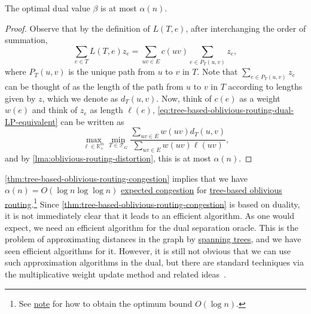 \begin{theorem}\label{thm:tree-based-oblivious-routing-congestion}
	The optimal dual value \(\beta \) is at most \(\alpha (n)\).
\end{theorem}
\begin{proof}
	Observe that by the definition of \(L(T, e)\), after interchanging the order of summation,
	\[
		\sum_{e \in T} L(T, e) z_e
		= \sum_{uv \in E} c(uv) \sum_{e \in P_T(u, v)}  z_e,
	\]
	where \(P_T(u, v)\) is the unique path from \(u\) to \(v\) in \(T\). Note that \(\sum_{e \in P_T(u, v)} z_e\) can be thought of as the length of the path from \(u\) to \(v\) in \(T\) according to lengths given by \(z\), which we denote as \(d_T(u, v)\). Now, think of \(c(e)\) as a weight \(w(e)\) and think of \(z_e\) as length \(\ell (e)\), \autoref{eq:tree-based-oblivious-routing-dual-LP-equivalent} can be written as
	\[
		\max _{\ell \in \mathbb{R} _{+}^m} \min _{T \in \mathcal{T} _G} \frac{\sum_{uv \in E} w(uv) d_T(u, v)}{\sum_{uv \in E} w(uv) \ell (uv)},
	\]
	and by \autoref{lma:oblivious-routing-distortion}, this is at most \(\alpha (n)\).
\end{proof}

\autoref{thm:tree-based-oblivious-routing-congestion} implies that we have \(\alpha (n) = O(\log n \log \log n)\) \hyperref[def:expected-congestion]{expected congestion} for \hyperref[not:tree-based-oblivious-routing]{tree-based oblivious routing}.\footnote{See \href{https://courses.grainger.illinois.edu/cs598csc/fa2024/Notes/lec-oblivious-routing.pdf}{note} for how to obtain the optimum bound \(O(\log n)\).} Since \autoref{thm:tree-based-oblivious-routing-congestion} is based on duality, it is not immediately clear that it leads to an efficient algorithm. As one would expect, we need an efficient algorithm for the dual separation oracle. This is the problem of approximating distances in the graph by \hyperref[def:spanning-tree]{spanning trees}, and we have seen efficient algorithms for it. However, it is still not obvious that we can use such approximation algorithms in the dual, but there are standard techniques via the multiplicative weight update method and related ideas~\cite{racke2008optimal}.